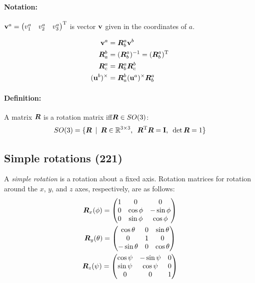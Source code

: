 \documentclass[a4paper, 12pt]{article}
\begin{document}
\paragraph{Notation:} \( \mathbf{v}^a = \begin{pmatrix} v_1^a & v_2^a & v_3^a \end{pmatrix}^{\text{T}} \) is vector \( \mathbf{v} \) given in the coordinates of \(a\).

\begin{equation}
	\begin{aligned}
		\mathbf{v}^a				&= \bm{R}_b^a \mathbf{v}^b \\
		\bm{R}_a^b				&= (\bm{R}_b^a)^{-1} = (\bm{R}_b^a)^{\text{T}} \\
		\bm{R}^a_c				&= \bm{R}^a_b \bm{R}^b_c \\
		(\mathbf{u}^b)^\times	&= \bm{R}^b_a (\mathbf{u}^a)^\times \bm{R}^a_b \\
	\end{aligned}
\end{equation}
\paragraph{Definition:} A matrix \(\bm{R}\) is a rotation matrix iff\(\bm{R} \in SO(3)\):
\begin{equation}
	SO(3) = \lbrace \bm{R} \enspace |
	\enspace \bm{R} \in \mathbb{R}^{3 \times 3},
	\enspace \bm{R}^{\text{T}}\bm{R} = \mathbf{I},
	\enspace \det \bm{R} = 1 \rbrace
\end{equation}

\subsection{Simple rotations (221)}
A \emph{simple rotation} is a rotation about a fixed axis. Rotation matrices for rotation around the \( x \), \( y \), and \( z \) axes, respectively, are as follows:
\begin{gather}\label{eq:simplerot}
	\bm{R}_x(\phi) =
	\begin{pmatrix}
		1 & 0         & 0          \\
		0 & \cos \phi & -\sin \phi \\
		0 & \sin \phi & \cos \phi  \\
	\end{pmatrix} \\
	\bm{R}_y(\theta) =
	\begin{pmatrix}
		\cos \theta  & 0 & \sin \theta \\
		0            & 1 & 0           \\
		-\sin \theta & 0 & \cos \theta \\
	\end{pmatrix} \\
	\bm{R}_z(\psi) =
	\begin{pmatrix}
		\cos \psi & -\sin \psi & 0 \\
		\sin \psi & \cos \psi  & 0 \\
		0         & 0          & 1 \\
	\end{pmatrix}
\end{gather}
\end{document}
